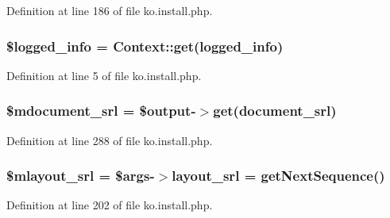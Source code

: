 Definition at line 186 of file ko.\+install.\+php.

\subsubsection[{\texorpdfstring{\$logged\+\_\+info}{$logged_info}}]{\setlength{\rightskip}{0pt plus 5cm}\$logged\+\_\+info = {\bf Context\+::get}(\textquotesingle{}logged\+\_\+info\textquotesingle{})}\hypertarget{ko_8install_8php_a193c1593ceb216e9fb05b0bad01ebbc8}{}\label{ko_8install_8php_a193c1593ceb216e9fb05b0bad01ebbc8}


Definition at line 5 of file ko.\+install.\+php.

\subsubsection[{\texorpdfstring{\$mdocument\+\_\+srl}{$mdocument_srl}}]{\setlength{\rightskip}{0pt plus 5cm}\$mdocument\+\_\+srl = \$output-\/$>$get(\textquotesingle{}document\+\_\+srl\textquotesingle{})}\hypertarget{ko_8install_8php_a27c211d9a984964f84c8ffb6ea7328fc}{}\label{ko_8install_8php_a27c211d9a984964f84c8ffb6ea7328fc}


Definition at line 288 of file ko.\+install.\+php.

\subsubsection[{\texorpdfstring{\$mlayout\+\_\+srl}{$mlayout_srl}}]{\setlength{\rightskip}{0pt plus 5cm}\${\bf mlayout\+\_\+srl} = \$args-\/$>${\bf layout\+\_\+srl} = {\bf get\+Next\+Sequence}()}\hypertarget{ko_8install_8php_a576210f0eec2e42df2c40e04a3972bb0}{}\label{ko_8install_8php_a576210f0eec2e42df2c40e04a3972bb0}


Definition at line 202 of file ko.\+install.\+php.

